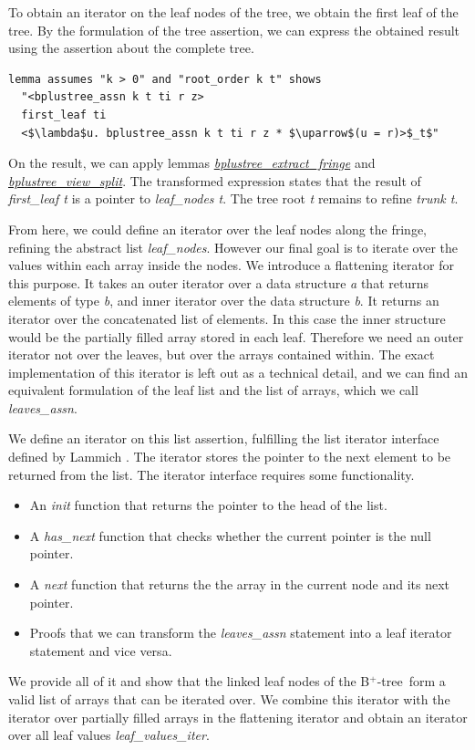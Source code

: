 \documentclass[a4paper,UKenglish,cleveref, cref, thm-restate]{lipics-v2021}
\newcommand{\btree}{B$^+$-tree}
\begin{document}
To obtain an iterator on the leaf nodes of the tree,
we obtain the first leaf of the tree.
By the formulation of the tree assertion, we can express
the obtained result using the assertion about the complete tree.

\begin{lstlisting}[mathescape=true, language=Isabelle,label=lst:btree-first-leaf]
lemma assumes "k > 0" and "root_order k t" shows
  "<bplustree_assn k t ti r z>
  first_leaf ti
  <$\lambda$u. bplustree_assn k t ti r z * $\uparrow$(u = r)>$_t$"
\end{lstlisting}

On the result, we can apply lemmas \hyperref[lst:btree-extract-fringe]{\emph{bplustree\_extract\_fringe}} 
and \hyperref[lst:btree-view-split]{\emph{bplustree\_view\_split}}.
The transformed expression states that
the result of \emph{first\_leaf t} is a pointer to \emph{leaf\_nodes t}.
The tree root \emph{t} remains to refine \emph{trunk t}.

From here, we could define an iterator over the leaf nodes
along the fringe, refining the abstract list \emph{leaf\_nodes}.
However our final goal is to iterate over the values within each array inside the nodes.
We introduce a flattening iterator for this purpose.
It takes an outer iterator over a data structure \textit{a} that returns elements of type \textit{b},
and inner iterator over the data structure \textit{b}.
It returns an iterator over the concatenated list of elements.
In this case the inner structure would be the partially filled array
stored in each leaf.
Therefore we need an outer iterator not over the leaves, but over the arrays
contained within.
The exact implementation of this iterator is left out as a technical detail,
and we can find an equivalent formulation of the leaf list and the list of arrays,
which we call \emph{leaves\_assn}.

We define an iterator on this list assertion,
fulfilling the list iterator interface defined by Lammich \cite{DBLP:conf/itp/Lammich19}.
The iterator stores the pointer to the next element to be returned from the list.
The iterator interface requires some functionality.
\begin{itemize}
    \item An \emph{init} function that returns the pointer to the head of the list.
    \item A \emph{has\_next} function that checks whether the current pointer is the null pointer.
    \item A \emph{next} function that returns the the array in the current node and its next pointer.
    \item Proofs that we can transform the \emph{leaves\_assn} statement into 
          a leaf iterator statement and vice versa.
\end{itemize}
We provide all of it and show that the linked leaf nodes of the \btree\ form a valid
list of arrays that can be iterated over.
We combine this iterator with the iterator over partially filled arrays
in the flattening iterator and obtain an iterator over all leaf values \emph{leaf\_values\_iter}.
\end{document}
